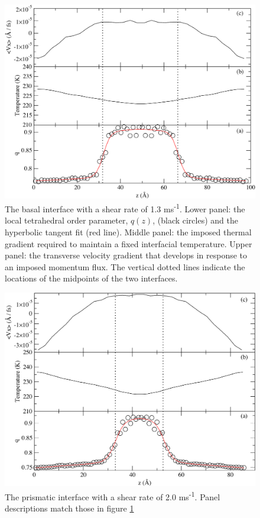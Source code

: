 \begin{figure}
\includegraphics[width=\linewidth]{Figures/bComicStrip}
\caption{\label{fig:bComic} The basal interface with a shear rate of
  1.3 ms\textsuperscript{-1}.  Lower panel: the local tetrahedral order parameter, $q(z)$,
  (black circles) and the hyperbolic tangent fit (red line).  Middle
  panel: the imposed thermal gradient required to maintain a fixed
  interfacial temperature.  Upper panel: the transverse velocity
  gradient that develops in response to an imposed momentum flux.  The
  vertical dotted lines indicate the locations of the midpoints of the
  two interfaces.}
\end{figure}

\begin{figure}
\includegraphics[width=\linewidth]{Figures/pComicStrip}
\caption{\label{fig:pComic} The prismatic interface with a shear rate
  of 2.0 ms\textsuperscript{-1}.  Panel
  descriptions match those in figure \ref{fig:bComic}}
\end{figure}

